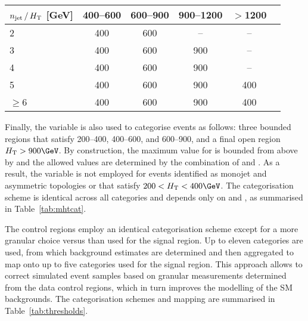 \begin{table}[!h]
  \label{tab:mht-binning}
  \centering
  \begin{tabular}{ lccccc }
    \hline
    $n_{\mathrm{jet}}\, / \,H_{\mathrm{T}}$ [GeV] & 400--600 & 600--900 & 900--1200 & $>$1200 \\
    \hline
    2                           & 400      & 600      & --        & --      \\ 
    3                           & 400      & 600      & 900       & --      \\ 
    4                           & 400      & 600      & 900       & --      \\ 
    5                           & 400      & 600      & 900       & 400     \\ 
    $\geq$6                     & 400      & 600      & 900       & 400     \\ 
    \hline
  \end{tabular}
\end{table}

Finally, the \mht variable is also used to categorise events as
follows: three bounded regions that satisfy 200--400, 400--600, and
600--900, and a final open region $\scalht > 900\GeV$. By
construction, the maximum value for \mht is bounded from above by
\scalht and the allowed values are determined by the combination of
\njet and \scalht. As a result, the \mht variable is not employed for
events identified as monojet and asymmetric topologies or that satisfy
$200 < \scalht < 400\GeV$. The \mht categorisation scheme is identical
across all \nb categories and depends only on \njet and \scalht, as
summarised in Table~\ref{tab:mhtcat}.

The control regions employ an identical categorisation scheme except
for a more granular choice versus \scalht than used for the signal
region. Up to eleven categories are used, from which background
estimates are determined and then aggregated to map onto up to five
\scalht categories used for the signal region.  This approach allows
to correct simulated event samples based on granular measurements
determined from the data control regions, which in turn improves the
modelling of the SM backgrounds. The categorisation schemes and
mapping are summarised in Table~\ref{tab:thresholds}.



